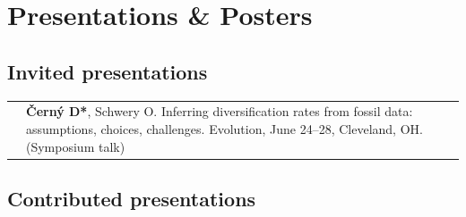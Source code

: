 \documentclass[10pt]{article}
\begin{document}
\section*{Presentations \& Posters}

\subsection*{Invited presentations}

\begin{tabularx}{\textwidth}{>{\raggedleft\arraybackslash}p{2.2cm} X}
2022 & \textbf{\v{C}ern\'{y} D*}, Schwery O. Inferring diversification rates from fossil data: assumptions, choices, challenges. Evolution, June 24--28, Cleveland, OH. (Symposium talk)
\end{tabularx}

\subsection*{Contributed presentations}
\end{document}
